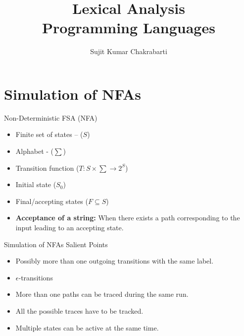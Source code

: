 \documentclass{beamer}
\title[Sujit]{Lexical Analysis \\
Programming Languages}
\author{Sujit Kumar Chakrabarti}
\institute{IIITB}
\date{}
\begin{document}
\maketitle

\section{Simulation of NFAs}

\begin{frame}{Non-Deterministic FSA (NFA)}
\begin{itemize}
	\item Finite set of states -- ($S$)
	\item Alphabet - ($\sum$)
	\item Transition function ($T : S \times \sum \rightarrow 2^S$)
	\item Initial state ($S_0$)
	\item Final/accepting states ($F \subseteq S$)
	\pause
	\item \textbf{Acceptance of a string: }When there exists a path corresponding to the input leading to an accepting state.
\end{itemize}

\end{frame}

\begin{frame}{Simulation of NFAs}
{Salient Points}

\begin{itemize}
\item Possibly more than one outgoing transitions with the same label.
\item $\epsilon$-transitions
\item More than one paths can be traced during the same run.
\item All the possible traces have to be tracked.
\item Multiple states can be active at the same time.
\end{itemize}
\end{frame}
\end{document}
